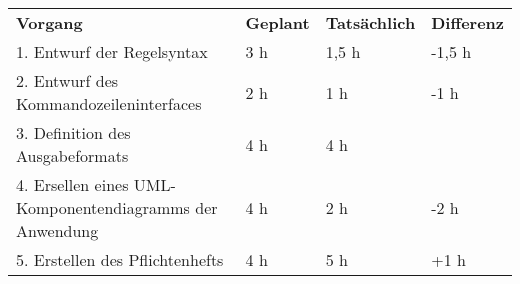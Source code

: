 \begin{tabularx}{\textwidth}{Xlll}
\rowcolor{heading}\textbf{Vorgang} & \textbf{Geplant} & \textbf{Tatsächlich} & \textbf{Differenz} \\
1. Entwurf der Regelsyntax & 3 h   & 1,5 h   & -1,5 h \\
\rowcolor{odd}2. Entwurf des Kommandozeileninterfaces  & 2 h   & 1 h   & -1 h \\
3. Definition des Ausgabeformats & 4 h   & 4 h   &  \\
\rowcolor{odd}4. Ersellen eines UML-Komponentendiagramms der Anwendung & 4 h   & 2 h   & -2 h \\
5. Erstellen des Pflichtenhefts & 4 h   & 5 h   &  +1 h \\
\end{tabularx}
